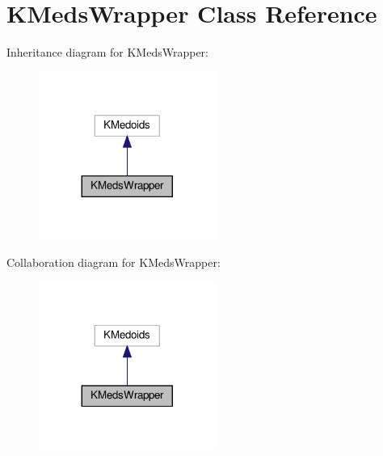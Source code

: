 \hypertarget{classKMedsWrapper}{}\section{K\+Meds\+Wrapper Class Reference}
\label{classKMedsWrapper}


Inheritance diagram for K\+Meds\+Wrapper\+:\nopagebreak
\begin{figure}[H]
\begin{center}
\leavevmode
\includegraphics[width=164pt]{classKMedsWrapper__inherit__graph}
\end{center}
\end{figure}


Collaboration diagram for K\+Meds\+Wrapper\+:\nopagebreak
\begin{figure}[H]
\begin{center}
\leavevmode
\includegraphics[width=164pt]{classKMedsWrapper__coll__graph}
\end{center}
\end{figure}
